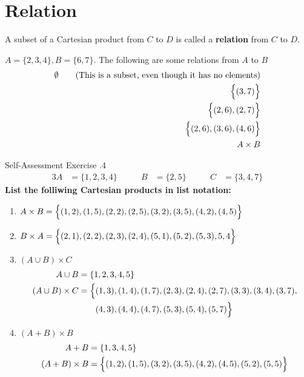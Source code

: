 \documentclass[../notes.tex]{subfiles}
\begin{document}
		\section{Relation}
			A subset of a Cartesian product from $C$ to $D$ is called a \textbf{relation} from $C$ to $D$.
			\begin{examplebox}
				$A = \{2, 3, 4\}, B = \{6, 7\}$. The following are some relations from $A$ to $B$
				\begin{align*}
					\emptyset \tag*{(This is a subset, even though it has no elements)}\\
					\Bigl\{(3, 7)\Bigr\}\\
					\Bigl\{(2, 6), (2, 7)\Bigr\}\\
					\Bigl\{(2, 6), (3, 6), (4, 6)\Bigr\}\\
					A \times B
				\end{align*}
			\end{examplebox}
				\begin{exercisebox}{Self-Assessment Exercise \thechapter.4}
					\begin{alignat*}{3}
						A &= \{1, 2, 3, 4\} \qquad & B &= \{2, 5\} \qquad & C &= \{3, 4, 7\}
					\end{alignat*}
					\textbf{List the folliwing Cartesian products in list notation:}
					\begin{enumerate}[label=(\alph*)]
						\item $A \times B = \Bigl\{(1, 2), (1, 5), (2, 2), (2, 5), (3, 2), (3, 5), (4, 2), (4, 5)\Bigr\}$
						\item $B \times A = \Bigl\{(2, 1), (2, 2), (2, 3), (2, 4), (5, 1), (5, 2), (5, 3), {5, 4}\Bigr\}$
						\item $(A \cup B) \times C$
							\begin{align*}
								A \cup B &= \{1, 2, 3, 4, 5\}\\
								(A \cup B) \times C &= \Bigl\{(1, 3), (1, 4), (1, 7), (2, 3), (2, 4), (2, 7), (3, 3), (3, 4), (3, 7),\\
								& \qquad (4, 3), (4, 4), (4, 7), (5, 3), (5, 4), (5, 7)\Bigr\}
							\end{align*}
						\item $(A + B) \times B$
							\begin{align*}
								A + B &= \{1, 3, 4, 5\}\\
								(A + B) \times B &= \Bigl\{(1, 2), (1, 5), (3, 2), (3, 5), (4, 2), (4, 5), (5, 2), (5, 5)\Bigr\}
							\end{align*}
					\end{enumerate}
				\end{exercisebox}
				\pagebreak
\end{document}
